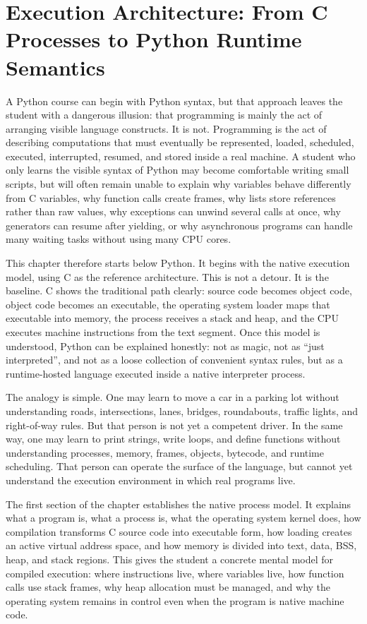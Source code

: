 \chapter{Execution Architecture: From C Processes to Python Runtime Semantics}

A Python course can begin with Python syntax, but that approach leaves the student with a dangerous illusion: that programming is mainly the act of arranging visible language constructs. It is not. Programming is the act of describing computations that must eventually be represented, loaded, scheduled, executed, interrupted, resumed, and stored inside a real machine. A student who only learns the visible syntax of Python may become comfortable writing small scripts, but will often remain unable to explain why variables behave differently from C variables, why function calls create frames, why lists store references rather than raw values, why exceptions can unwind several calls at once, why generators can resume after yielding, or why asynchronous programs can handle many waiting tasks without using many CPU cores.

This chapter therefore starts below Python. It begins with the native execution model, using C as the reference architecture. This is not a detour. It is the baseline. C shows the traditional path clearly: source code becomes object code, object code becomes an executable, the operating system loader maps that executable into memory, the process receives a stack and heap, and the CPU executes machine instructions from the text segment. Once this model is understood, Python can be explained honestly: not as magic, not as ``just interpreted'', and not as a loose collection of convenient syntax rules, but as a runtime-hosted language executed inside a native interpreter process.

The analogy is simple. One may learn to move a car in a parking lot without understanding roads, intersections, lanes, bridges, roundabouts, traffic lights, and right-of-way rules. But that person is not yet a competent driver. In the same way, one may learn to print strings, write loops, and define functions without understanding processes, memory, frames, objects, bytecode, and runtime scheduling. That person can operate the surface of the language, but cannot yet understand the execution environment in which real programs live.

The first section of the chapter establishes the native process model. It explains what a program is, what a process is, what the operating system kernel does, how compilation transforms C source code into executable form, how loading creates an active virtual address space, and how memory is divided into text, data, BSS, heap, and stack regions. This gives the student a concrete mental model for compiled execution: where instructions live, where variables live, how function calls use stack frames, why heap allocation must be managed, and why the operating system remains in control even when the program is native machine code.

